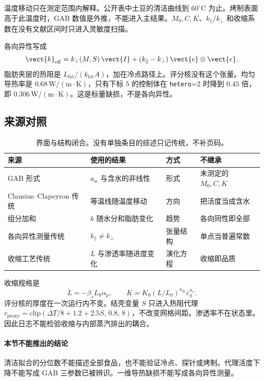 温度移动只在测定范围内解释。公开表中土豆的清洁曲线到 $60^\circ\mathrm{C}$ 为止。烤制表面高于此温度时，GAB 数值是外推，不能进入主结果。$M_0,C,K$、$k_\parallel/k_\perp$ 和收缩系数在没有文献区间时只进入灵敏度扫描。

各向异性写成
\[
\vect{k}_{\mathrm{eff}}=k_\perp(M,S)\,\vect{I}+(k_\parallel-k_\perp)\,\vect{e}\otimes\vect{e}.
\]
脂肪夹层的热阻是 $L_{\mathrm{fat}}/(k_{\mathrm{fat}}A)$，加在冷点路径上。评分核没有这个张量。均匀导热率是 $0.68\,\mathrm{W/(m\cdot K)}$，只有下标 $5$ 的控制体在 \texttt{hetero}=2 时降到 $0.45$ 倍，即 $0.306\,\mathrm{W/(m\cdot K)}$。这是标量缺损，不是各向异性。

\subsection{来源对照}
\begin{table}[ht]
\centering
\caption{界面与结构闭合。没有单独条目的综述只记传统，不补页码。}
\begin{tabularx}{\textwidth}{lXll}
\toprule
来源 & 使用的结果 & 方式 & 不继承 \\
\midrule
GAB 形式 \cite{gab1980,sorption2026} & \(a_w\) 与含水的非线性 & 形式 & 未测定的 \(M_0,C,K\) \\
Clausius--Clapeyron 传统 & 等温线随温度移动 & 方向 & 把活度当成含水 \\
组分加和 \cite{choi1986} & \(k\) 随水分和脂肪变化 & 趋势 & 各向同性即全部 \\
各向异性测量传统 & \(k_\parallel\neq k_\perp\) & 张量结构 & 单点当普遍常数 \\
收缩工艺传统 & \(L\) 与渗透率随进度变化 & 演化方程 & 收缩即品质 \\
\bottomrule
\end{tabularx}
\end{table}

收缩规格是
\[
\dot L=-\beta_s L_0\dot\alpha_p,\qquad K=K_0(L/L_0)^{n_K}\varepsilon_g^{n_\varepsilon}.
\]
评分核的厚度在一次运行内不变。结壳变量 $S$ 只进入热阻代理 $r_{\mathrm{proxy}}=\mathrm{clip}(\Delta T/8+1.2+2.5 S,\,0.8,\,8)$，不改变网格间距。渗透率不在状态里。因此日志不能检验收缩与内部蒸汽排出的耦合。

\paragraph{本节不能推出的结论}
清洁拟合的分位数不能描述全部食品，也不能验证冷点、探针或烤制。代理活度下降不能写成 GAB 三参数已被辨识。一维导热缺损不能写成各向异性测量。

